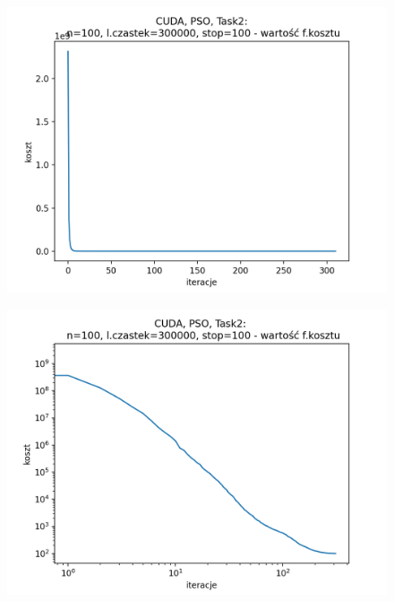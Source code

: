 \documentclass[11pt, a4paper, oneside]{article}
\begin{document}
\begin{figure}[H]
\centering
\begin{minipage}[b]{\dimexpr.5\textwidth-1em}
  \centering
  \includegraphics[width=1\linewidth]{grafiki/CUDA/CUDA_PSO_Task2_koszt_linear.png}
  \label{fig:koszt:PSO2CUDA}
\end{minipage} \hfill
\begin{minipage}[b]{\dimexpr.5\textwidth-1em}
  \centering
  \includegraphics[width=1\linewidth]{grafiki/CUDA/CUDA_PSO_Task2_koszt_log.png}
  \label{fig:koszt:PSO2CUDAlog}
\end{minipage}
\end{figure}
\end{document}
